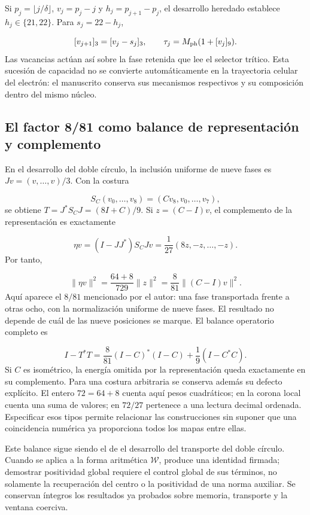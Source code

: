 Si \(p_j=\lfloor j/\delta\rfloor\), \(v_j=p_j-j\) y \(h_j=p_{j+1}-p_j\), el desarrollo heredado establece \(h_j\in\{21,22\}\). Para \(s_j=22-h_j\),

\[
[v_{j+1}]_3=[v_j-s_j]_3,\qquad
\tau_j=M_{\rm ph}(1+[v_j]_9).
\]
Las vacancias actúan así sobre la fase retenida que lee el selector trítico. Esta sucesión de capacidad no se convierte automáticamente en la trayectoria celular del electrón: el manuscrito conserva sus mecanismos respectivos y su composición dentro del mismo núcleo.



\subsection{El factor 8/81 como balance de representación y complemento}
En el desarrollo del doble círculo, la inclusión uniforme de nueve fases es \(Jv=(v,\ldots,v)/3\). Con la costura

\[
S_C(v_0,\ldots,v_8)=(Cv_8,v_0,\ldots,v_7),
\]
se obtiene \(T=J^*S_CJ=(8I+C)/9\). Si \(z=(C-I)v\), el complemento de la representación es exactamente

\[
\eta v=(I-JJ^*)S_CJv=\frac1{27}(8z,-z,\ldots,-z).
\]
Por tanto,

\[
\|\eta v\|^2=\frac{64+8}{729}\|z\|^2
=\frac8{81}\|(C-I)v\|^2.
\]
Aquí aparece el \(8/81\) mencionado por el autor: una fase transportada frente a otras ocho, con la normalización uniforme de nueve fases. El resultado no depende de cuál de las nueve posiciones se marque. El balance operatorio completo es

\[
I-T^*T=\frac8{81}(I-C)^*(I-C)+\frac19(I-C^*C).
\]
Si \(C\) es isométrico, la energía omitida por la representación queda exactamente en su complemento. Para una costura arbitraria se conserva además su defecto explícito. El entero \(72=64+8\) cuenta aquí pesos cuadráticos; en la corona local cuenta una suma de valores; en \(72/27\) pertenece a una lectura decimal ordenada. Especificar esos tipos permite relacionar las construcciones sin suponer que una coincidencia numérica ya proporciona todos los mapas entre ellas.

Este balance sigue siendo el de el desarrollo del transporte del doble círculo. Cuando se aplica a la forma aritmética \(\mathscr W\), produce una identidad firmada; demostrar positividad global requiere el control global de sus términos, no solamente la recuperación del centro o la positividad de una norma auxiliar. Se conservan íntegros los resultados ya probados sobre memoria, transporte y la ventana coerciva.
